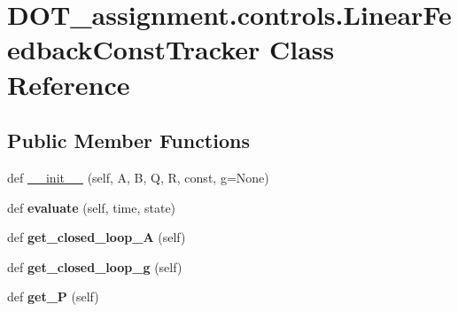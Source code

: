 \hypertarget{class_d_o_t__assignment_1_1controls_1_1_linear_feedback_const_tracker}{}\section{D\+O\+T\+\_\+assignment.\+controls.\+Linear\+Feedback\+Const\+Tracker Class Reference}
\label{class_d_o_t__assignment_1_1controls_1_1_linear_feedback_const_tracker}
\subsection*{Public Member Functions}
\begin{DoxyCompactItemize}
\item 
def \mbox{\hyperlink{class_d_o_t__assignment_1_1controls_1_1_linear_feedback_const_tracker_a5673a5219e7675de2bf80ea945aa33f1}{\+\_\+\+\_\+init\+\_\+\+\_\+}} (self, A, B, Q, R, const, g=None)
\item 
\mbox{\label{class_d_o_t__assignment_1_1controls_1_1_linear_feedback_const_tracker_a268f5fdaf81ea651387a3faa157698d2}} 
def {\bfseries evaluate} (self, time, state)
\item 
\mbox{\label{class_d_o_t__assignment_1_1controls_1_1_linear_feedback_const_tracker_a32585f11e7d14f6f8ae44eb9f0c215f9}} 
def {\bfseries get\+\_\+closed\+\_\+loop\+\_\+A} (self)
\item 
\mbox{\label{class_d_o_t__assignment_1_1controls_1_1_linear_feedback_const_tracker_a302b34aa49ff50eaf2d43477aad9fc0c}} 
def {\bfseries get\+\_\+closed\+\_\+loop\+\_\+g} (self)
\item 
\mbox{\label{class_d_o_t__assignment_1_1controls_1_1_linear_feedback_const_tracker_a33dd0b54690743b81a843e73c6246bea}} 
def {\bfseries get\+\_\+P} (self)
\item 
\mbox{\label{class_d_o_t__assignment_1_1controls_1_1_linear_feedback_const_tracker_aa4761299bc8cb3249ce7d277fc0d87b4}} 

\end{DoxyCompactItemize}
